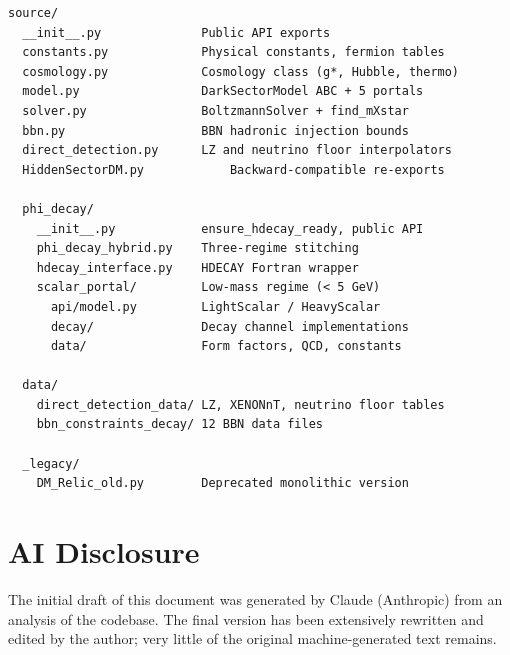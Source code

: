 \documentclass[11pt]{article}
\numberwithin{equation}{section}
\begin{document}
\begin{verbatim}
source/
  __init__.py              Public API exports
  constants.py             Physical constants, fermion tables
  cosmology.py             Cosmology class (g*, Hubble, thermo)
  model.py                 DarkSectorModel ABC + 5 portals
  solver.py                BoltzmannSolver + find_mXstar
  bbn.py                   BBN hadronic injection bounds
  direct_detection.py      LZ and neutrino floor interpolators
  HiddenSectorDM.py            Backward-compatible re-exports

  phi_decay/
    __init__.py            ensure_hdecay_ready, public API
    phi_decay_hybrid.py    Three-regime stitching
    hdecay_interface.py    HDECAY Fortran wrapper
    scalar_portal/         Low-mass regime (< 5 GeV)
      api/model.py         LightScalar / HeavyScalar
      decay/               Decay channel implementations
      data/                Form factors, QCD, constants

  data/
    direct_detection_data/ LZ, XENONnT, neutrino floor tables
    bbn_constraints_decay/ 12 BBN data files

  _legacy/
    DM_Relic_old.py        Deprecated monolithic version
\end{verbatim}


\section*{AI Disclosure}
The initial draft of this document was generated by Claude (Anthropic) from an analysis of the codebase. The final version has been extensively rewritten and edited by the author; very little of the original machine-generated text remains.
\clearpage
{}
{}


\end{document}
